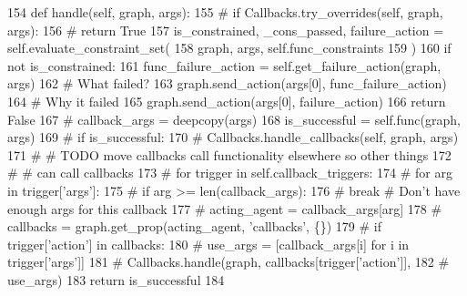 \begin{DoxyCode}
154     \textcolor{keyword}{def }handle(self, graph, args):
155         \textcolor{comment}{# if Callbacks.try\_overrides(self, graph, args):}
156         \textcolor{comment}{#     return True}
157         is\_constrained, \_cons\_passed, failure\_action = self.evaluate\_constraint\_set(
158             graph, args, self.func\_constraints
159         )
160         \textcolor{keywordflow}{if} \textcolor{keywordflow}{not} is\_constrained:
161             func\_failure\_action = self.get\_failure\_action(graph, args)
162             \textcolor{comment}{# What failed?}
163             graph.send\_action(args[0], func\_failure\_action)
164             \textcolor{comment}{# Why it failed}
165             graph.send\_action(args[0], failure\_action)
166             \textcolor{keywordflow}{return} \textcolor{keyword}{False}
167         \textcolor{comment}{# callback\_args = deepcopy(args)}
168         is\_successful = self.func(graph, args)
169         \textcolor{comment}{# if is\_successful:}
170         \textcolor{comment}{#     Callbacks.handle\_callbacks(self, graph, args)}
171         \textcolor{comment}{#     # TODO move callbacks call functionality elsewhere so other things}
172         \textcolor{comment}{#     # can call callbacks}
173         \textcolor{comment}{#     for trigger in self.callback\_triggers:}
174         \textcolor{comment}{#         for arg in trigger['args']:}
175         \textcolor{comment}{#             if arg >= len(callback\_args):}
176         \textcolor{comment}{#                 break  # Don't have enough args for this callback}
177         \textcolor{comment}{#             acting\_agent = callback\_args[arg]}
178         \textcolor{comment}{#             callbacks = graph.get\_prop(acting\_agent, 'callbacks', \{\})}
179         \textcolor{comment}{#             if trigger['action'] in callbacks:}
180         \textcolor{comment}{#                 use\_args = [callback\_args[i] for i in trigger['args']]}
181         \textcolor{comment}{#                 Callbacks.handle(graph, callbacks[trigger['action']],}
182         \textcolor{comment}{#                                  use\_args)}
183         \textcolor{keywordflow}{return} is\_successful
184 
\end{DoxyCode}
\mbox{\label{classlight__chats_1_1graph_1_1GraphFunction_a8b76e8a8bb07f75abd081e220683dbd4}} 
